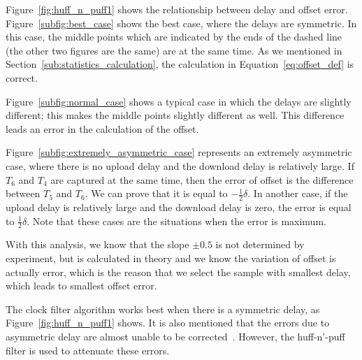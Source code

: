 Figure~\ref{fig:huff_n_puff1} shows the relationship between
delay and offset error.  Figure~\ref{subfig:best_case} shows the best case,
where the delays are symmetric. In this case, the middle points which are
indicated by the ends of the dashed line (the other two figures are the same)
are at the same time. As we mentioned in
Section~\ref{sub:statistics_calculation}, the calculation in
Equation~\ref{eq:offset_def} is correct. 



Figure~\ref{subfig:normal_case} shows a typical case in which the delays are
slightly different; this makes the middle points slightly different as well.
This difference leads an error in the calculation of the offset.

Figure~\ref{subfig:extremely_asymmetric_case} represents an extremely
asymmetric case, where there is no upload delay and the download delay is
relatively large. If $T_6$ and $T_4$ are captured at the same time, then the
error of offset is the difference between $T_5$ and $T_6$. We can prove that it
is equal to $-\frac{1}{2}\delta$. In another case, if the upload delay is
relatively large and the download delay is zero, the error is equal to
$\frac{1}{2}\delta$. Note that these cases are the situations when the error is
maximum.

With this analysis, we know that the slope $\pm0.5$ is not determined by
experiment, but is calculated in theory and we know the variation of offset is
actually error, which is the reason that we select the sample with smallest
delay, which leads to smallest offset error.

The clock filter algorithm works best when there is a symmetric delay, as
Figure~\ref{fig:huff_n_puff1} shows. It is also mentioned that the errors due
to asymmetric delay are almost unable to be corrected~\cite{redbook}. However,
the huff-n'-puff filter is used to attenuate these errors.

